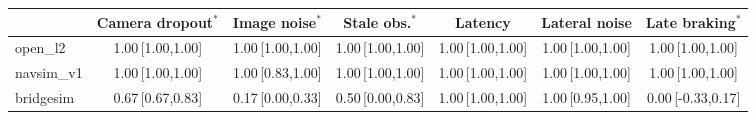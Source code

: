 \begin{tabular}{@{}lcccccc@{}}
\toprule
 & Camera dropout$^{\ast}$ & Image noise$^{\ast}$ & Stale obs.$^{\ast}$ & Latency & Lateral noise & Late braking$^{\ast}$ \\
\midrule
open\_l2 & 1.00\,{\scriptsize[1.00,1.00]} & 1.00\,{\scriptsize[1.00,1.00]} & 1.00\,{\scriptsize[1.00,1.00]} & 1.00\,{\scriptsize[1.00,1.00]} & 1.00\,{\scriptsize[1.00,1.00]} & 1.00\,{\scriptsize[1.00,1.00]} \\
navsim\_v1 & 1.00\,{\scriptsize[1.00,1.00]} & 1.00\,{\scriptsize[0.83,1.00]} & 1.00\,{\scriptsize[1.00,1.00]} & 1.00\,{\scriptsize[1.00,1.00]} & 1.00\,{\scriptsize[1.00,1.00]} & 1.00\,{\scriptsize[1.00,1.00]} \\
bridgesim & 0.67\,{\scriptsize[0.67,0.83]} & 0.17\,{\scriptsize[0.00,0.33]} & 0.50\,{\scriptsize[0.00,0.83]} & 1.00\,{\scriptsize[1.00,1.00]} & 1.00\,{\scriptsize[0.95,1.00]} & 0.00\,{\scriptsize[-0.33,0.17]} \\
\bottomrule
\end{tabular}

